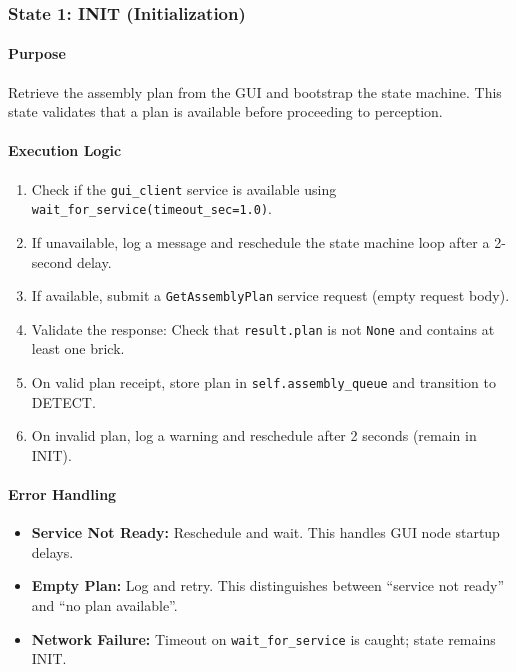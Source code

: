 \subsubsection{State 1: INIT (Initialization)}
\label{state:init}

\paragraph{Purpose}

Retrieve the assembly plan from the GUI and bootstrap the state machine. This state validates that a plan is available before proceeding to perception.

\paragraph{Execution Logic}

\begin{enumerate}
    \item Check if the \texttt{gui\_client} service is available using \texttt{wait\_for\_service(timeout\_sec=1.0)}.
    \item If unavailable, log a message and reschedule the state machine loop after a 2-second delay.
    \item If available, submit a \texttt{GetAssemblyPlan} service request (empty request body).
    \item Validate the response: Check that \texttt{result.plan} is not \texttt{None} and contains at least one brick.
    \item On valid plan receipt, store plan in \texttt{self.assembly\_queue} and transition to DETECT.
    \item On invalid plan, log a warning and reschedule after 2 seconds (remain in INIT).
\end{enumerate}

\paragraph{Error Handling}

\begin{itemize}
    \item \textbf{Service Not Ready:} Reschedule and wait. This handles GUI node startup delays.
    \item \textbf{Empty Plan:} Log and retry. This distinguishes between ``service not ready'' and ``no plan available''.
    \item \textbf{Network Failure:} Timeout on \texttt{wait\_for\_service} is caught; state remains INIT.
\end{itemize}

